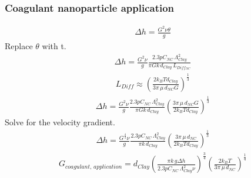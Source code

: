 \documentclass[letterpaper,10pt,english]{sphinxmanual}
\begin{document}
\subsubsection{Coagulant nanoparticle application}
\label{\detokenize{Rapid_Mix/RM_Theory_and_Future_Work:coagulant-nanoparticle-application}}\begin{equation}\label{equation:Rapid_Mix/RM_Theory_and_Future_Work:Rapid_Mix/RM_Theory_and_Future_Work:17}
\begin{split}\Delta h =   \frac{G^2 \nu \theta}{g}\end{split}
\end{equation}
Replace \(\theta\) with t.
\begin{equation}\label{equation:Rapid_Mix/RM_Theory_and_Future_Work:Rapid_Mix/RM_Theory_and_Future_Work:18}
\begin{split}\Delta h =  \frac{G^2 \nu}{g} \frac{2.3p C_{NC} \, \Lambda_{Clay}^2}{\pi G k \, d_{Clay}\,  L_{Diff_{NC}} }\end{split}
\end{equation}\begin{equation}\label{equation:Rapid_Mix/RM_Theory_and_Future_Work:Rapid_Mix/RM_Theory_and_Future_Work:19}
\begin{split}L_{Diff} \approx \left( \frac{2k_B T d_{Clay}}{3 \pi \,\mu  \, d_{NC} G}\right)^\frac{1}{3}\end{split}
\end{equation}\begin{equation}\label{equation:Rapid_Mix/RM_Theory_and_Future_Work:Rapid_Mix/RM_Theory_and_Future_Work:20}
\begin{split}\Delta h =  \frac{G^2 \nu}{g} \frac{2.3p C_{NC} \, \Lambda_{Clay}^2}{\pi G k \, d_{Clay}} \left( \frac{3 \pi \,\mu  \, d_{NC} G}{2k_B T d_{Clay}}\right)^\frac{1}{3}\end{split}
\end{equation}
Solve for the velocity gradient.
\begin{equation}\label{equation:Rapid_Mix/RM_Theory_and_Future_Work:Rapid_Mix/RM_Theory_and_Future_Work:21}
\begin{split}\Delta h =  \frac{G^\frac{4}{3} \nu}{g} \frac{2.3p C_{NC} \, \Lambda_{Clay}^2}{\pi k \, d_{Clay}} \left( \frac{3 \pi \,\mu  \, d_{NC} }{2k_B T d_{Clay}}\right)^\frac{1}{3}\end{split}
\end{equation}\begin{equation}\label{equation:Rapid_Mix/RM_Theory_and_Future_Work:Rapid_Mix/RM_Theory_and_Future_Work:22}
\begin{split}G_{coagulant, \, application} =  d_{Clay}\left(\frac{\pi k \,g\Delta h }{2.3p C_{NC} \, \Lambda_{Clay}^2 \nu} \right)^\frac{3}{4} \left( \frac{2k_B T }{3 \pi \,\mu  \, d_{NC} }\right)^\frac{1}{4}\end{split}
\end{equation}
\end{document}

